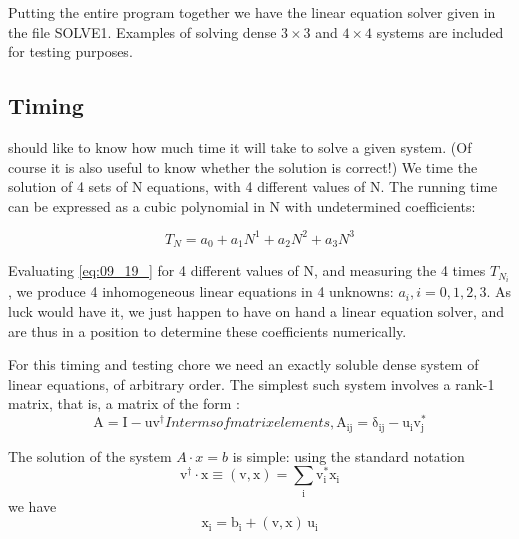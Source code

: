 Putting the entire program together we have the linear equation
solver given in the file SOLVE1. Examples of solving dense $3\times 3$
and $4\times 4$ systems are included for testing purposes.

\subsection{Timing}
 should like to know how much time it will take to solve a 
given system. (Of course it is also useful to know whether the
solution is correct!) We time the solution of 4 sets of N equations,
with 4 different values of N. The running time can be expressed
as a cubic polynomial in N with undetermined coefficients:
\addtocounter{equation}{-3} %
\begin{equation}
    T_N=a_0+a_1N^1+a_2N^2+a_3N^3 \label{eq:09_19_}
\end{equation}

Evaluating \ref{eq:09_19_} for 4 different values of N, and measuring the 4
times $T_{N_i}$ , we produce 4 inhomogeneous linear equations in 4 
unknowns: $a_i , i = 0, 1, 2, 3$. As luck would have it, we just happen to have on hand a linear equation solver, and are thus in a
position to determine these coefficients numerically.

For this timing and testing chore we need an exactly soluble dense
system of linear equations, of arbitrary order. The simplest such
system involves a rank-1 matrix, that is, a matrix of the form :
\begin{subequations}
\begin{equation}
 \label{eq:09_20_}
    \mathrm{A = I - u v^\dagger}
\end{equation}
In terms of matrix elements,

\begin{equation}
 \label{eq:09_20prime_}
    \mathrm{A_{ij} = \delta_{ij} - u_i v_j^*}
\end{equation}
\end{subequations}

The solution of the system $A\cdot x = b$ is simple: using the standard
notation
\begin{equation}
 \label{eq:09_21_}
    \mathrm{v^\dagger \cdot x \equiv (v,x) = \sum_{i}v_i^*x_i}
\end{equation}
we have
\begin{equation}
 \label{eq:09_22_}
    \mathrm{x_i = b_i + (v,x)\,u_i}
\end{equation}

